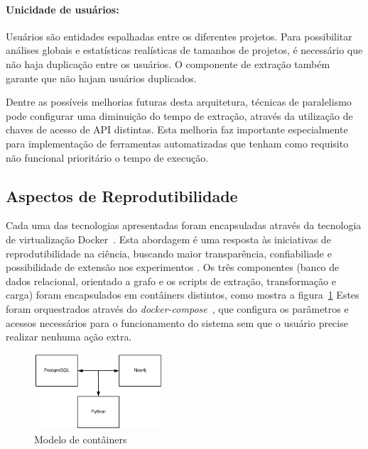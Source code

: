 \documentclass[peerreview]{acmart}
\begin{document}
\paragraph{Unicidade de usuários: } Usuários são entidades espalhadas entre os diferentes projetos. Para possibilitar análises globais e estatísticas realísticas de tamanhos de projetos, é necessário que não haja duplicação entre os usuários. O componente de extração também garante que não hajam usuários duplicados.


Dentre as possíveis melhorias futuras desta arquitetura, técnicas de paralelismo pode configurar uma diminuição do tempo de extração, através da utilização de chaves de acesso de API distintas. Esta melhoria faz importante especialmente para implementação de ferramentas automatizadas que tenham como requisito não funcional prioritário o tempo de execução.

\subsection{Aspectos de Reprodutibilidade}

Cada uma das tecnologias apresentadas foram encapsuladas através da tecnologia de virtualização Docker~\cite{merkel2014}. Esta abordagem é uma resposta às iniciativas de reprodutibilidade na ciência, buscando maior transparência, confiabiliade e possibilidade de extensão nos experimentos \cite{freire2012}. Os três componentes (banco de dados relacional, orientado a grafo e os scripts de extração, transformação e carga) foram encapsulados em contâiners distintos, como mostra a figura~\ref{fig:docker-model} Estes foram orquestrados através do \textit{docker-compose}~\cite{merkel2014}, que configura os parâmetros e acessos necessários para o funcionamento do sistema sem que o usuário precise realizar nenhuma ação extra.

\begin{figure}[!htbp]
 \includegraphics[width=180]{docker-model}
 \caption{Modelo de contâiners}\label{fig:docker-model}
\end{figure}
\end{document}
